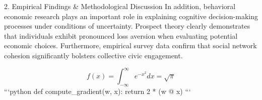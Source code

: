 2. Empirical Findings & Methodological Discussion
In addition, behavioral economic research plays an important role in explaining cognitive decision-making processes under conditions of uncertainty. Prospect theory clearly demonstrates that individuals exhibit pronounced loss aversion when evaluating potential economic choices. Furthermore, empirical survey data confirm that social network cohesion significantly bolsters collective civic engagement.

$$ f(x) = \int_{-\infty}^{\infty} e^{-x^2} dx = \sqrt{\pi} $$ 
```python
def compute_gradient(w, x):
    return 2 * (w @ x)
```